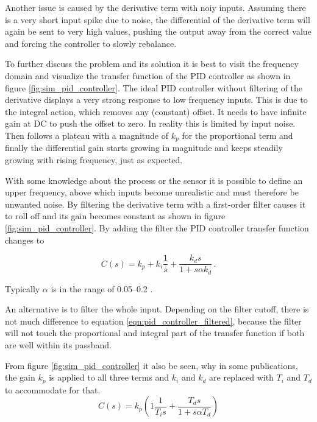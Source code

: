 Another issue is caused by the derivative term with noiy inputs. Assuming there is a very short input spike due to noise, the differential of the derivative term will again be sent to very high values, pushing the output away from the correct value and forcing the controller to slowly rebalance.

To further discuss the problem and its solution it is best to visit the frequency domain and visualize the transfer function of the PID controller as shown in figure \ref{fig:sim_pid_controller}. The ideal PID controller without filtering of the derivative displays a very strong response to low frequency inputs. This is due to the integral action, which removes any (constant) offset. It needs to have infinite gain at DC to push the offset to zero. In reality this is limited by input noise. Then follows a plateau with a magnitude of $k_p$ for the proportional term and finally the differential gain starts growing in magnitude and keeps steadily growing with rising frequency, just as expected.

With some knowledge about the process or the sensor it is possible to define an upper frequency, above which inputs become unrealistic and must therefore be unwanted noise. By filtering the derivative term with a first-order filter causes it to roll off and its gain becomes constant as shown in figure \ref{fig:sim_pid_controller}. By adding the filter the PID controller transfer function changes to

\begin{equation}
    C(s) = k_p + k_i \frac{1}{s} + \frac{k_d s}{1 + s \alpha k_d} \,. \label{eqn:pid_controller_filtered}
\end{equation}

Typically $\alpha$ is in the range of \numrange{0.05}{0.2} \citep[p. 129]{pid_controller}.

An alternative is to filter the whole input. Depending on the filter cutoff, there is not much difference to equation \ref{eqn:pid_controller_filtered}, because the filter will not touch the proportional and integral part of the transfer function if both are well within its passband.

From figure \ref{fig:sim_pid_controller} it also be seen, why in some publications, the gain $k_p$ is applied to all three terms and $k_i$ and $k_d$ are replaced with $T_i$ and $T_d$ to accommodate for that.
\begin{equation}
    C(s) = k_p \left(1 \frac{1}{T_i s} + \frac{T_d s}{1 + s \alpha T_d} \right) \label{eqn:pid_controller_series}
\end{equation}

